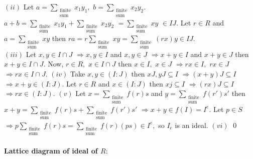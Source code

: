 \documentclass[11pt]{amsart}
\begin{document}
\newline $(ii)$ Let $a={\displaystyle\sum_{\substack{\text{finite}\\ \text{sum}}}x_{1}y_{1}},$ $b={\displaystyle\sum_{\substack{\text{finite}\\ \text{sum}}}x_{2}y_{2}}.$ $a+b={\displaystyle\sum_{\substack{\text{finite}\\ \text{sum}}}x_{1}y_{1}}+{\displaystyle\sum_{\substack{\text{finite}\\ \text{sum}}}x_{2}y_{2}}$ $={\displaystyle\sum_{\substack{\text{finite}\\ \text{sum}}}xy}$ $\in IJ.$ Let $r \in R$ and $a={\displaystyle\sum_{\substack{\text{finite}\\ \text{sum}}}xy}$ then $ra=r{\displaystyle\sum_{\substack{\text{finite}\\ \text{sum}}}xy}={\displaystyle\sum_{\substack{\text{finite}\\ \text{sum}}}(rx)y} \in IJ.$  \\
\newline $(iii)$ Let $x,y \in I\cap J$ $\Rightarrow x,y\in I$ and $x,y\in J$ $\Rightarrow x+y\in I$ and $x+y\in J$ then $x+y \in I\cap J.$ Now, $r \in R,$ $x\in I\cap J$ then $x\in I,$ $x \in J$ $\Rightarrow rx \in I,$ $rx\in J$ $\Rightarrow rx\in I\cap J.$  
\newline $(iv)$ Take $x,y \in (I:J)$ then $xJ,yJ \subseteq I$ $\Rightarrow (x+y)J\subseteq I$ $\Rightarrow x+y \in (I:J).$ Let $r \in R$ and $x \in (I:J)$ then $xj \subseteq I$ $\Rightarrow (rx)J \subseteq I$ $\Rightarrow rx \in (I:J).$  
\newline $(v)$ Let $x={\displaystyle\sum_{\substack{\text{finite}\\ \text{sum}}}f(r)s}$ and $y={\displaystyle\sum_{\substack{\text{finite}\\ \text{sum}}}f(r')s'}$ then $x+y={\displaystyle\sum_{\substack{\text{finite}\\ \text{sum}}}f(r)s}+{\displaystyle\sum_{\substack{\text{finite}\\ \text{sum}}}f(r')s'}$ $\Rightarrow x+y \in f(I)=I^{e}.$ Let $p\in S$ $\Rightarrow p{\displaystyle\sum_{\substack{\text{finite}\\ \text{sum}}}f(r)s}={\displaystyle\sum_{\substack{\text{finite}\\ \text{sum}}}f(r)(ps)}\in I^{e},$ so $I_{e}$ is an ideal. 
\newline $(vi)$ \qed\\\\
\textbf{Lattice diagram of ideal of $R:$}\\
\end{document}
